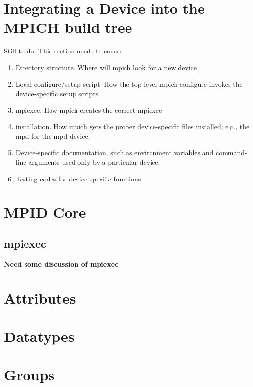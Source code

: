 \documentclass{article}
\begin{document}
\section{Integrating a Device into the MPICH build tree}
Still to do.  This section needs to cover:
\begin{enumerate}
\item Directory structure.  Where will mpich look for a new device
\item Local configure/setup script.  How the top-level mpich configure invokes
  the device-specific setup scripts
\item mpiexec.  How mpich creates the correct mpiexec
\item installation.  How mpich gets the proper device-specific files
  installed; e.g., the mpd for the mpd device.
\item Device-specific documentation, such as environment variables and
  command-line arguments used only by a particular device.
\item Testing codes for device-specific functions
\end{enumerate}







\section{MPID Core}



\subsection{mpiexec}
\textbf{Need some discussion of mpiexec}

\section{Attributes}




\section{Datatypes}




\section{Groups}


\end{document}
